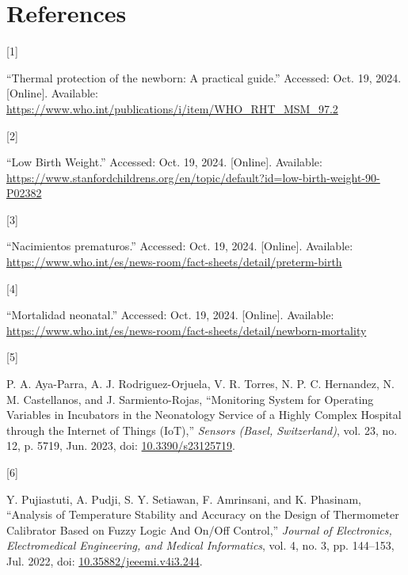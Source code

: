\documentclass{article}
\newlength{\cslhangindent}
\newlength{\csllabelwidth}
\newenvironment{CSLReferences}[2] %
 {\begin{list}{}{%
  \setlength{\itemindent}{0pt}
  \setlength{\leftmargin}{0pt}
  \setlength{\parsep}{0pt}
  \ifodd #1
   \setlength{\leftmargin}{\cslhangindent}
   \setlength{\itemindent}{-1\cslhangindent}
  \fi
  \setlength{\itemsep}{#2\baselineskip}}}
 {\end{list}}
\newcommand{\CSLLeftMargin}[1]{\parbox[t]{\csllabelwidth}{#1}}
\newcommand{\CSLRightInline}[1]{\parbox[t]{\linewidth - \csllabelwidth}{#1}\break}
\begin{document}
\section*{References}\label{references}

\label{refs}
\begin{CSLReferences}{0}{0}
\CSLLeftMargin{{[}1{]} }%
\CSLRightInline{{``Thermal protection of the newborn: A practical
guide.''} Accessed: Oct. 19, 2024. {[}Online{]}. Available:
\url{https://www.who.int/publications/i/item/WHO_RHT_MSM_97.2}}

\CSLLeftMargin{{[}2{]} }%
\CSLRightInline{{``Low {Birth} {Weight}.''} Accessed: Oct. 19, 2024.
{[}Online{]}. Available:
\url{https://www.stanfordchildrens.org/en/topic/default?id=low-birth-weight-90-P02382}}

\CSLLeftMargin{{[}3{]} }%
\CSLRightInline{{``Nacimientos prematuros.''} Accessed: Oct. 19, 2024.
{[}Online{]}. Available:
\url{https://www.who.int/es/news-room/fact-sheets/detail/preterm-birth}}

\CSLLeftMargin{{[}4{]} }%
\CSLRightInline{{``Mortalidad neonatal.''} Accessed: Oct. 19, 2024.
{[}Online{]}. Available:
\url{https://www.who.int/es/news-room/fact-sheets/detail/newborn-mortality}}

\CSLLeftMargin{{[}5{]} }%
\CSLRightInline{P. A. Aya-Parra, A. J. Rodriguez-Orjuela, V. R. Torres,
N. P. C. Hernandez, N. M. Castellanos, and J. Sarmiento-Rojas,
{``Monitoring {System} for {Operating} {Variables} in {Incubators} in
the {Neonatology} {Service} of a {Highly} {Complex} {Hospital} through
the {Internet} of {Things} ({IoT}),''} \emph{Sensors (Basel,
Switzerland)}, vol. 23, no. 12, p. 5719, Jun. 2023, doi:
\href{https://doi.org/10.3390/s23125719}{10.3390/s23125719}.}

\CSLLeftMargin{{[}6{]} }%
\CSLRightInline{Y. Pujiastuti, A. Pudji, S. Y. Setiawan, F. Amrinsani,
and K. Phasinam, {``Analysis of {Temperature} {Stability} and {Accuracy}
on the {Design} of {Thermometer} {Calibrator} {Based} on {Fuzzy} {Logic}
{And} {On}/{Off} {Control},''} \emph{Journal of Electronics,
Electromedical Engineering, and Medical Informatics}, vol. 4, no. 3, pp.
144--153, Jul. 2022, doi:
\href{https://doi.org/10.35882/jeeemi.v4i3.244}{10.35882/jeeemi.v4i3.244}.}


\end{CSLReferences}
\end{document}
